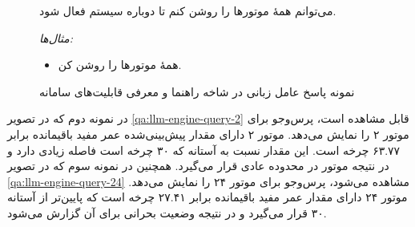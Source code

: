 \documentclass[a4paper,fleqn]{report}
\newcommand{\exLabel}{\textit{\textcolor{exampleColor}{مثال‌ها:}}}
\begin{document}
\begin{figure}[h]
\begin{minipage}{0.92\textwidth}
\begin{botBox}
			می‌توانم همهٔ موتورها را روشن کنم تا دوباره سیستم فعال شود.
			
			\exLabel
			\begin{itemize}[rightmargin=1.5em, topsep=2pt, itemsep=1pt]
				\item همهٔ موتورها را روشن کن.
			\end{itemize}
			
		\end{botBox}
		
	\end{minipage}
	\caption{نمونه پاسخ عامل زبانی در شاخه راهنما و معرفی قابلیت‌های سامانه}
	\label{qa:llm-help}
\end{figure}


در نمونه دوم که در تصویر 
\ref{qa:llm-engine-query-2}
قابل مشاهده است، پرس‌وجو برای موتور ۲ را نمایش می‌دهد. موتور ۲ دارای مقدار پیش‌بینی‌شده عمر مفید باقیمانده برابر ۶۳.۷۷ چرخه است. این مقدار نسبت به آستانه که ۳۰ چرخه است فاصله زیادی دارد و در نتیجه موتور در محدوده عادی قرار می‌گیرد. 
همچنین در نمونه سوم که در تصویر
\ref{qa:llm-engine-query-24}
مشاهده می‌شود، پرس‌وجو برای موتور ۲۴ را نمایش می‌دهد. موتور ۲۴ دارای مقدار عمر مفید باقیمانده برابر ۲۷.۴۱ چرخه است که پایین‌تر از آستانه ۳۰ قرار می‌گیرد و در نتیجه وضعیت بحرانی برای آن گزارش می‌شود.
\




\end{document}
